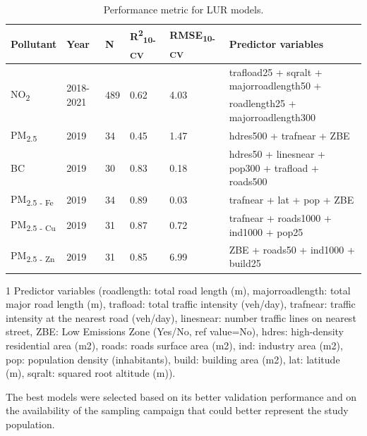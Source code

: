 \documentclass{article}
\begin{document}
\begin{table}[ht]
\centering
\begin{threeparttable}
\caption{Performance metric for LUR models.}
\label{Table S3}
\begin{tabular}{llllll}
\toprule
\textbf{Pollutant} & \textbf{Year} & \textbf{N}  &  \textbf{R\textsuperscript{2}\textsubscript{10-CV}} & \textbf{RMSE\textsubscript{10-CV}} & \textbf{Predictor variables}\tnote{1} \\
\midrule
\multirow{2}{*}{NO\textsubscript{2}} & \multirow{2}{*}{2018-2021} & \multirow{2}{*}{489} & \multirow{2}{*}{0.62} & \multirow{2}{*}{4.03} & trafload25 + sqralt + majorroadlength50 + \\ 
 & & & & & roadlength25 + majorroadlength300 \\
\midrule
PM\textsubscript{2.5} & 2019 & 34 & 0.45 & 1.47 & hdres500 + trafnear + ZBE \\
\midrule
BC & 2019 & 30  & 0.83 & 0.18 & hdres50 + linesnear + pop300 + trafload + roads500 \\
\midrule
PM\textsubscript{2.5 - Fe} & 2019 & 34 & 0.89 & 0.03 & trafnear + lat + pop + ZBE  \\
\midrule
PM\textsubscript{2.5 - Cu} & 2019 & 31 & 0.87 & 0.72 & trafnear + roads1000 + ind1000 + pop25 \\
\midrule
PM\textsubscript{2.5 - Zn} & 2019 & 31  & 0.85 & 6.99 & ZBE + roads50 + ind1000 + build25  \\
\bottomrule
\end{tabular}
\begin{tablenotes}
\small
\item[1] Predictor variables (roadlength: total road length (m), majorroadlength: total major road length (m), trafload: total traffic intensity (veh/day), trafnear: traffic intensity at the nearest road (veh/day), linesnear: number traffic lines on nearest street, ZBE: Low Emissions Zone (Yes/No, ref value=No), hdres: high-density residential area (m2), roads: roads surface area (m2), ind: industry area (m2), pop: population density (inhabitants), build: building area (m2), lat: latitude (m), sqralt: squared root altitude (m)).
\end{tablenotes}
\end{threeparttable}
\end{table}

The best models were selected based on its better validation performance and on the availability of the sampling campaign that could better represent the study population. 
\end{document}
